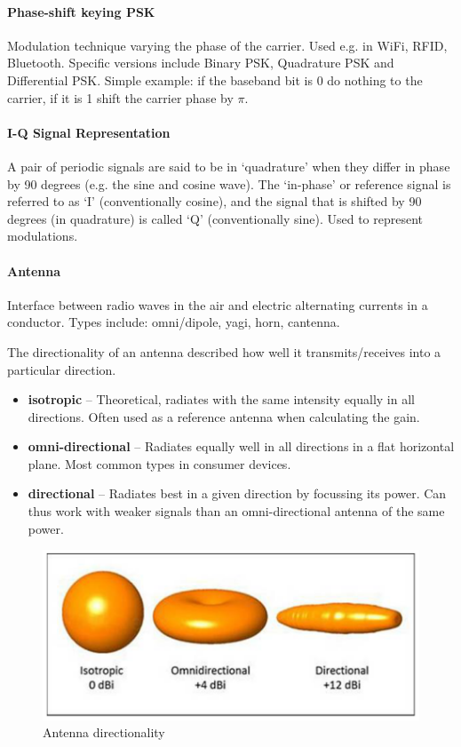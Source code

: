 \paragraph{Phase-shift keying PSK}
Modulation technique varying the phase of the carrier.
Used e.g. in WiFi, RFID, Bluetooth.
Specific versions include Binary PSK, Quadrature PSK and Differential PSK.
Simple example: if the baseband bit is 0 do nothing to the carrier, if it is 1 shift the carrier phase by $\pi$.

\paragraph{I-Q Signal Representation}
A pair of periodic signals are said to be in ‘quadrature’ when they differ in phase by 90 degrees (e.g. the sine and cosine wave).
The ‘in-phase’ or reference signal is referred to as ‘I’ (conventionally cosine), and the signal that is shifted by 90 degrees (in quadrature) is called ‘Q’ (conventionally sine).
Used to represent modulations.

\paragraph{Antenna}
Interface between radio waves in the air and electric alternating currents in a conductor.
Types include: omni/dipole, yagi, horn, cantenna.

The directionality of an antenna described how well it transmits/receives into a particular direction.
\begin{itemize}
	\item \textbf{isotropic} -- Theoretical, radiates with the same intensity equally in all directions. Often used as a reference antenna when calculating the gain.
	\item \textbf{omni-directional} -- Radiates equally well in all directions in a flat horizontal plane. Most common types in consumer devices.
	\item \textbf{directional} -- Radiates best in a given direction by focussing its power. Can thus work with weaker signals than an omni-directional antenna of the same power.
\end{itemize}

\begin{figure}
	\centering
	\includegraphics[scale=0.4]{images/1-directionality.png}
	\caption{Antenna directionality}
	\label{fig:directionality}
\end{figure}

